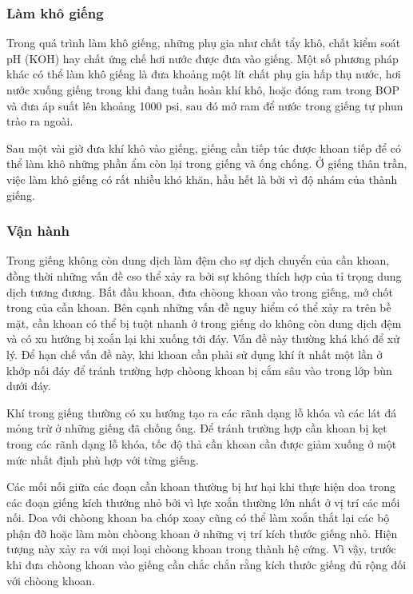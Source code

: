 \documentclass[13pt,a4paper]{article}
\begin{document}
\subsubsection{Làm khô giếng}
	Trong quá trình làm khô giếng, những phụ gia như chất tẩy khô, chất kiểm soát pH (KOH) hay chất ứng chế hơi nước được đưa vào giếng. Một số phương pháp khác có thể làm khô giếng là đưa khoảng một lít chất phụ gia hấp thụ nước, hơi nước xuống giếng trong khi đang tuần hoàn khí khô, hoặc đóng ram trong BOP và đưa áp suất lên khoảng 1000 psi, sau đó mở ram để nước trong giếng tự phun trào ra ngoài.\par
	Sau một vài giờ đưa khí khô vào giếng, giếng cần tiếp túc được khoan tiếp để có thể làm khô những phần ẩm còn lại trong giếng và ống chống. Ở giếng thân trần, việc làm khô giếng có rất nhiều khó khăn, hầu hết là bởi vì độ nhám của thành giếng.
\subsubsection{Vận hành}
	Trong giếng không còn dung dịch làm đệm cho sự dịch chuyển của cần khoan, đồng thời những vấn đề cso thể xảy ra bởi sự không thích hợp của tỉ trọng dung dịch tương đương. Bắt đầu khoan, đưa chòong khoan vào trong giếng, mở chốt trong của cần khoan. Bên cạnh những vấn đề nguy hiểm có thể xảy ra trên bề mặt, cần khoan có thể bị tuột nhanh ở trong giếng do không còn dung dịch đệm và có xu hướng bị xoắn lại khi xuống tới đáy. Vấn đề này thường khá khó để xử lý. Để hạn chế vấn đề này, khi khoan cần phải sử dụng khí ít nhất một lần ở khớp nối đáy để tránh trường hợp chòong khoan bị cắm sâu vào trong lớp bùn dưới đáy.\par
	Khí trong giếng thường có xu hướng tạo ra các rãnh dạng lỗ khóa và các lát đá mỏng trừ ở những giếng đã chống ống. Để tránh trường hợp cần khoan bị kẹt trong các rãnh dạng lỗ khóa, tốc độ thả cần khoan cần được giảm xuống ở một mức nhất định phù hợp với từng giếng.\par
	Các mối nối giữa các đoạn cần khoan thường bị hư hại khi thực hiện doa trong các đoạn giếng kích thướng nhỏ bởi vì lực xoắn thường lớn nhất ở vị trí các mối nối. Doa với chòong khoan ba chóp xoay cũng có thể làm xoắn thắt lại các bộ phận đỡ hoặc làm mòn chòong khoan ở những vị trí kích thước giếng nhỏ. Hiện tượng này xảy ra với mọi loại chòong khoan trong thành hệ cứng. Vì vậy, trước khi đưa chòong khoan vào giếng cần chắc chắn rằng kích thước giếng đủ rộng đối với chòong khoan.
\end{document}
